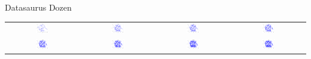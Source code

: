 \documentclass{beamer}
\begin{document}
\begin{frame}{Datasaurus Dozen}
  \begin{center}
    \begin{tabular}{cccc}
      \includegraphics[width=0.20\textwidth]{images/datasaurus-0.png} &
      \includegraphics[width=0.20\textwidth]{images/datasaurus-1.png} &
      \includegraphics[width=0.20\textwidth]{images/datasaurus-2.png} &
      \includegraphics[width=0.20\textwidth]{images/datasaurus-3.png} \\
      \includegraphics[width=0.20\textwidth]{images/datasaurus-4.png} &
      \includegraphics[width=0.20\textwidth]{images/datasaurus-5.png} &
      \includegraphics[width=0.20\textwidth]{images/datasaurus-6.png} &
      \includegraphics[width=0.20\textwidth]{images/datasaurus-7.png} \\

\end{tabular}
\end{center}
\end{frame}
\end{document}
